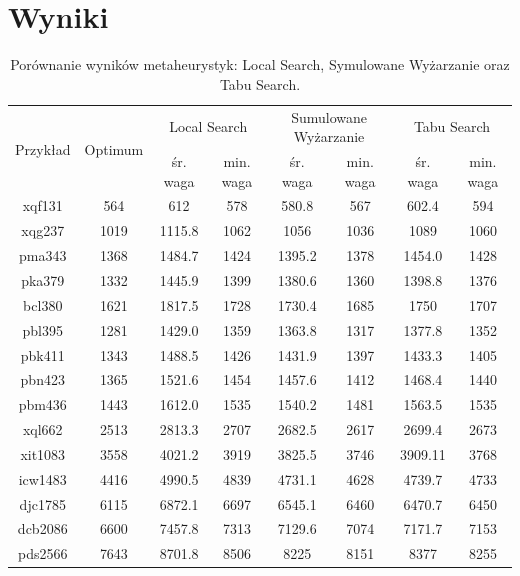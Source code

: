 \documentclass{article}
\begin{document}
\newpage

\section{Wyniki}

\begin{table}[h!]
    \centering
    \begin{tabular}{|c|c|c|c|c|c|c|c|}
        \hline
        \multirow{2}{*}{Przykład} & \multirow{2}{*}{Optimum} & \multicolumn{2}{|c|}{Local Search} & \multicolumn{2}{|c|}{Sumulowane Wyżarzanie}  & \multicolumn{2}{|c|}{Tabu Search}  \\
        \cline{3-8}
        & & śr. waga & min. waga & śr. waga & min. waga & śr. waga & min. waga \\
        \hline
        xqf131 & 564 & 612 & 578 & 580.8 & 567 & 602.4 & 594 \\
        \hline
        xqg237 & 1019 & 1115.8 & 1062 & 1056 & 1036 & 1089 & 1060 \\
        \hline
        pma343 & 1368 & 1484.7 & 1424 & 1395.2 & 1378 & 1454.0 & 1428 \\
        \hline
        pka379 & 1332 & 1445.9 & 1399 & 1380.6 & 1360 & 1398.8 & 1376 \\
        \hline
        bcl380 & 1621 & 1817.5 & 1728 & 1730.4 & 1685 & 1750 & 1707 \\
        \hline
        pbl395 & 1281 & 1429.0 & 1359 & 1363.8 & 1317 & 1377.8 & 1352 \\
        \hline
        pbk411 & 1343 & 1488.5 & 1426 & 1431.9 & 1397 & 1433.3 & 1405 \\
        \hline
        pbn423 & 1365 & 1521.6 & 1454 & 1457.6 & 1412 & 1468.4 & 1440 \\
        \hline
        pbm436 & 1443 & 1612.0 & 1535 & 1540.2 & 1481 & 1563.5 & 1535 \\
        \hline
        xql662 & 2513 & 2813.3 & 2707 & 2682.5 & 2617 & 2699.4 & 2673 \\
        \hline
        xit1083 & 3558 & 4021.2 & 3919 & 3825.5 & 3746 & 3909.11 & 3768 \\
        \hline
        icw1483 & 4416 & 4990.5 & 4839 & 4731.1 & 4628 & 4739.7 & 4733 \\
        \hline
        djc1785 & 6115 & 6872.1 & 6697 & 6545.1 & 6460 & 6470.7 & 6450 \\
        \hline
        dcb2086 & 6600 & 7457.8 & 7313 & 7129.6 & 7074 & 7171.7 & 7153 \\
        \hline
        pds2566 & 7643 & 8701.8 & 8506 & 8225 & 8151 & 8377 & 8255 \\
        \hline
    \end{tabular}
    \caption{Porównanie wyników metaheurystyk: Local Search, Symulowane Wyżarzanie oraz Tabu Search.}
\end{table}
\end{document}
